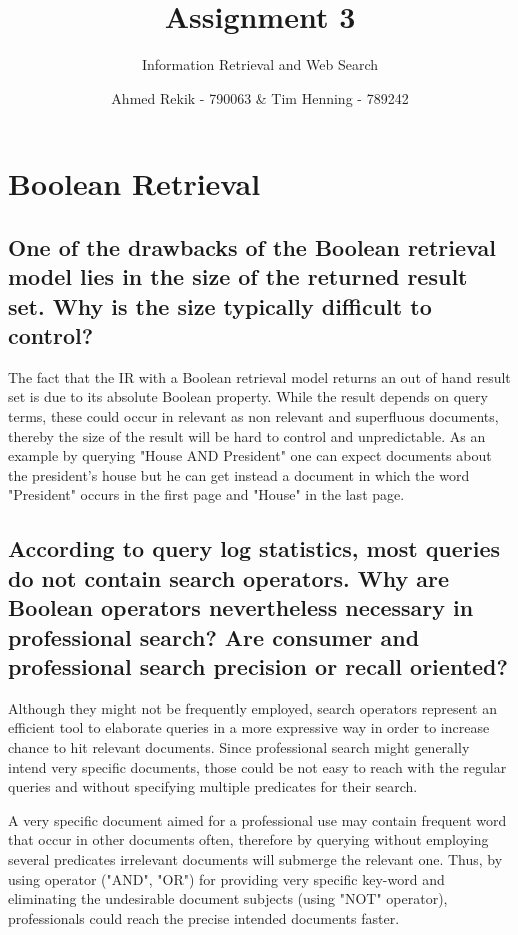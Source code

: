 \documentclass{scrartcl}
\title{Assignment 3}
\subtitle{Information Retrieval and Web Search}
\author{Ahmed Rekik - 790063 \& Tim Henning - 789242}
\begin{document}
\maketitle

\setcounter{section}{1}
\section{Boolean Retrieval}

\subsection{One of the drawbacks of the Boolean retrieval model lies in the size of the returned result
set. Why is the size typically difficult to control? }

The fact that the IR with a Boolean retrieval model returns an out of hand result set is due to its absolute Boolean property. While the result depends on query terms, these could occur in relevant as non relevant and superfluous documents, thereby the size of the result will be hard to control and unpredictable. As an example by querying "House AND President" one can expect documents about the president's house but he can get instead a document in which the word "President" occurs in the first page and "House" in the last page.


\subsection{According to query log statistics, most queries do not contain search operators. Why are
Boolean operators nevertheless necessary in professional search? Are consumer and professional
search precision or recall oriented? }

Although they might not be frequently employed, search operators represent an efficient tool to elaborate queries in a more expressive way in order to increase chance to hit relevant documents. Since professional search might generally intend very specific documents, those could be not easy to reach with the regular queries and without specifying multiple predicates for their search.

A very specific document aimed for a professional use may contain frequent word that occur in other documents often, therefore by querying without employing several predicates irrelevant documents will submerge the relevant one. Thus, by using operator ("AND", "OR") for providing very specific key-word and eliminating the undesirable document subjects (using "NOT" operator), professionals could reach the precise intended documents faster.
\end{document}

